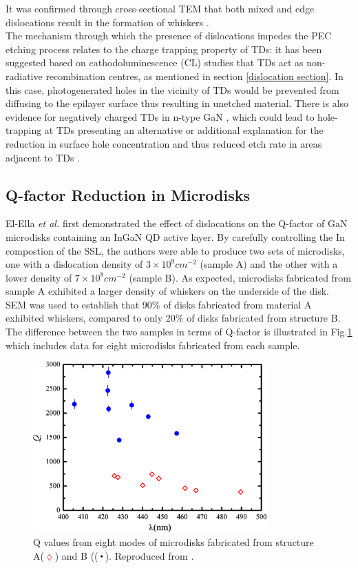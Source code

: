 It was confirmed through cross-sectional TEM that both mixed and edge dislocations result in the formation of whiskers \cite{Youtsey1998}.\\
The mechanism through which the presence of dislocations impedes the PEC etching process relates to the charge trapping property of TDs: it has been suggested based on cathodoluminescence (CL) studies that TDs act as non-radiative recombination centres, as mentioned in section \ref{dislocation section}. In this case, photogenerated holes in the vicinity of TDs would be prevented from diffusing to the epilayer surface thus resulting in unetched material. There is also evidence for negatively charged TDs in n-type GaN \cite{Cherns2000}, which could lead to hole-trapping at TDs presenting an alternative or additional explanation for the reduction in surface hole concentration and thus reduced etch rate in areas adjacent to TDs \cite{Youtsey1998}.

\subsection{Q-factor Reduction in Microdisks}

El-Ella \textit{et al.} first demonstrated the effect of dislocations on the Q-factor of GaN microdisks containing an InGaN QD active layer. By carefully controlling the In compostion of the SSL, the authors were able to produce two sets of microdisks, one with a dislocation density of $3 \times 10^{9} cm^{-2}$ (sample A) and the other with a lower density of $7 \times 10^{8} cm^{-2}$ (sample B). As expected, microdisks fabricated from sample A exhibited a larger density of whiskers on the underside of the disk. SEM was used to establish that 90$\%$ of disks fabricated from material A exhibited whiskers, compared to only 20$\%$  of disks fabricated from structure B. The difference between the two samples in terms of Q-factor is illustrated in Fig.\ref{El-Ellacomp} which includes data for eight microdisks fabricated from each sample. 

\begin{figure}[h]
	\centering
	\includegraphics[width=0.8\textwidth]{Figs/Ch4/elellacomp.png}
	\caption {Q values from eight modes of microdisks fabricated from structure A(\textcolor{red}{$\lozenge$}) and B ((\textcolor{blue}{$\Bigcdot$}). Reproduced from \cite{El-Ella2011}.}
	\label{El-Ellacomp}
\end{figure}
\FloatBarrier 

